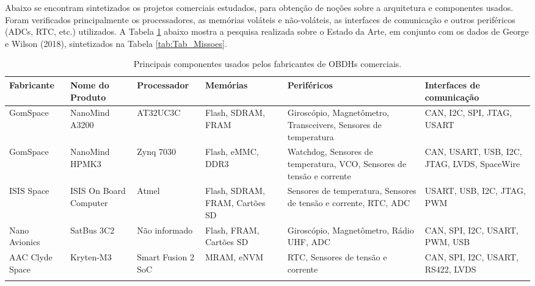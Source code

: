 Abaixo se encontram sintetizados os projetos comerciais estudados, para obtenção de noções sobre a arquitetura e componentes usados. Foram verificados principalmente os processadores, as memórias voláteis e não-voláteis, as interfaces de comunicação e outros periféricos (ADCs, RTC, etc.) utilizados. A Tabela \ref{tab:Tab_Rev} abaixo mostra a pesquisa realizada sobre o Estado da Arte, em conjunto com os dados de George e Wilson (2018), sintetizados na Tabela \ref{tab:Tab_Missoes}.

\begin{table}[htb]
    \centering
	\ABNTEXfontereduzida
	\caption{\label{tab:Tab_Rev}Principais componentes usados pelos fabricantes de OBDHs comerciais.}
    \begin{tabular}{@{}p{2cm}p{2.6cm}p{2cm}p{2cm}p{2.2cm}p{2.6cm}@{}}
		\toprule
		\textbf{Fabricante} & \textbf{Nome do Produto} & \textbf{Processador} & \textbf{Memórias} & \textbf{Periféricos} & \textbf{Interfaces de comunicação} \\ 
        \midrule
        GomSpace & NanoMind A3200 & AT32UC3C & Flash, SDRAM, FRAM & Giroscópio, Magnetômetro, Transceivers, Sensores de temperatura & CAN, I2C, SPI, JTAG, USART \\%
        
        \midrule
        GomSpace & NanoMind HPMK3 & Zynq 7030 & Flash, eMMC, DDR3 & Watchdog, Sensores de temperatura, VCO, Sensores de tensão e corrente & CAN, USART, USB, I2C, JTAG, LVDS, SpaceWire \\ %

        \midrule
        ISIS Space & ISIS On Board Computer & Atmel & Flash, SDRAM, FRAM, Cartões SD & Sensores de temperatura, Sensores de tensão e corrente, RTC, ADC & USART, USB, I2C, JTAG, PWM \\ %

        \midrule
        Nano Avionics & SatBus 3C2 & Não informado & Flash, FRAM, Cartões SD & Giroscópio, Magnetômetro, Rádio UHF, ADC & CAN, SPI, I2C, USART, PWM, USB \\ %

        \midrule
        AAC Clyde Space & Kryten-M3 & Smart Fusion 2 SoC & MRAM, eNVM & RTC, Sensores de tensão e corrente & CAN, SPI, I2C, USART, RS422, LVDS \\ %


		
        \\ \bottomrule
	\end{tabular}
\end{table}

